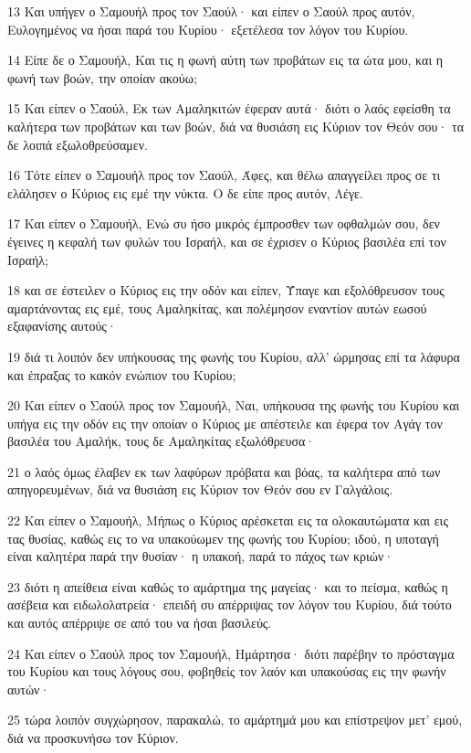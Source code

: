 \par 13 Και υπήγεν ο Σαμουήλ προς τον Σαούλ· και είπεν ο Σαούλ προς αυτόν, Ευλογημένος να ήσαι παρά του Κυρίου· εξετέλεσα τον λόγον του Κυρίου.
\par 14 Είπε δε ο Σαμουήλ, Και τις η φωνή αύτη των προβάτων εις τα ώτα μου, και η φωνή των βοών, την οποίαν ακούω;
\par 15 Και είπεν ο Σαούλ, Εκ των Αμαληκιτών έφεραν αυτά· διότι ο λαός εφείσθη τα καλήτερα των προβάτων και των βοών, διά να θυσιάση εις Κύριον τον Θεόν σου· τα δε λοιπά εξωλοθρεύσαμεν.
\par 16 Τότε είπεν ο Σαμουήλ προς τον Σαούλ, Άφες, και θέλω απαγγείλει προς σε τι ελάλησεν ο Κύριος εις εμέ την νύκτα. Ο δε είπε προς αυτόν, Λέγε.
\par 17 Και είπεν ο Σαμουήλ, Ενώ συ ήσο μικρός έμπροσθεν των οφθαλμών σου, δεν έγεινες η κεφαλή των φυλών του Ισραήλ, και σε έχρισεν ο Κύριος βασιλέα επί τον Ισραήλ;
\par 18 και σε έστειλεν ο Κύριος εις την οδόν και είπεν, Ύπαγε και εξολόθρευσον τους αμαρτάνοντας εις εμέ, τους Αμαληκίτας, και πολέμησον εναντίον αυτών εωσού εξαφανίσης αυτούς·
\par 19 διά τι λοιπόν δεν υπήκουσας της φωνής του Κυρίου, αλλ' ώρμησας επί τα λάφυρα και έπραξας το κακόν ενώπιον του Κυρίου;
\par 20 Και είπεν ο Σαούλ προς τον Σαμουήλ, Ναι, υπήκουσα της φωνής του Κυρίου και υπήγα εις την οδόν εις την οποίαν ο Κύριος με απέστειλε και έφερα τον Αγάγ τον βασιλέα του Αμαλήκ, τους δε Αμαληκίτας εξωλόθρευσα·
\par 21 ο λαός όμως έλαβεν εκ των λαφύρων πρόβατα και βόας, τα καλήτερα από των απηγορευμένων, διά να θυσιάση εις Κύριον τον Θεόν σου εν Γαλγάλοις.
\par 22 Και είπεν ο Σαμουήλ, Μήπως ο Κύριος αρέσκεται εις τα ολοκαυτώματα και εις τας θυσίας, καθώς εις το να υπακούωμεν της φωνής του Κυρίου; ιδού, η υποταγή είναι καλητέρα παρά την θυσίαν· η υπακοή, παρά το πάχος των κριών·
\par 23 διότι η απείθεια είναι καθώς το αμάρτημα της μαγείας· και το πείσμα, καθώς η ασέβεια και ειδωλολατρεία· επειδή συ απέρριψας τον λόγον του Κυρίου, διά τούτο και αυτός απέρριψε σε από του να ήσαι βασιλεύς.
\par 24 Και είπεν ο Σαούλ προς τον Σαμουήλ, Ημάρτησα· διότι παρέβην το πρόσταγμα του Κυρίου και τους λόγους σου, φοβηθείς τον λαόν και υπακούσας εις την φωνήν αυτών·
\par 25 τώρα λοιπόν συγχώρησον, παρακαλώ, το αμάρτημά μου και επίστρεψον μετ' εμού, διά να προσκυνήσω τον Κύριον.
